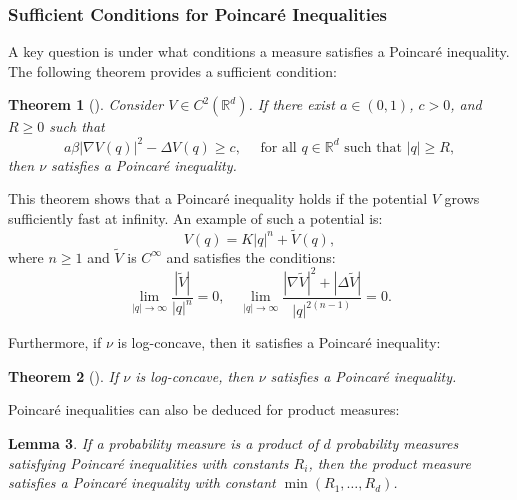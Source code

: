 \documentclass[11pt, twoside]{report}
\newtheorem{theorem}{Theorem}[section]
\newtheorem{lemma}[theorem]{Lemma}
\begin{document}
\subsubsection{Sufficient Conditions for Poincar\'{e} Inequalities}

A key question is under what conditions a measure satisfies a Poincar\'e inequality. The following theorem provides a sufficient condition:

\begin{theorem}[\texorpdfstring{\cite[Corollary 1.6]{Bakry2008}}{}]
Consider $V \in C^2(\mathbb{R}^d)$. If there exist $a \in (0,1)$, $c>0$, and $R \geq 0$ such that
\begin{equation}
a\beta |\nabla V(q)|^2 - \Delta V(q) \geq c, \quad \text{ for all } q \in \mathbb{R}^d \text{ such that } |q| \geq R,
\end{equation}
then $\nu$ satisfies a Poincar\'e inequality.
\end{theorem}

This theorem shows that a Poincar\'e inequality holds if the potential $V$ grows sufficiently fast at infinity. An example of such a potential is:
\begin{equation}
V(q) = K|q|^n + \tilde{V}(q),
\end{equation}
where $n \geq 1$ and $\tilde{V}$ is $C^\infty$ and satisfies the conditions:
\begin{equation}
\lim_{|q| \to \infty} \frac{|\tilde{V}|}{|q|^n} = 0, \quad \lim_{|q| \to \infty} \frac{|\nabla \tilde{V}|^2 + |\Delta \tilde{V}|}{|q|^{2(n-1)}} = 0.
\end{equation}

Furthermore, if $\nu$ is log-concave, then it satisfies a Poincar\'e inequality:
\begin{theorem}[\texorpdfstring{\cite[Corollary 1.9]{Bakry2008}}{}]
If $\nu$ is log-concave, then $\nu$ satisfies a Poincar\'e inequality.
\end{theorem}
Poincar\'e inequalities can also be deduced for product measures:
\begin{lemma}
If a probability measure is a product of $d$ probability measures satisfying Poincar\'e inequalities with constants $R_i$, then the product measure satisfies a Poincar\'e inequality with constant $\min(R_1, \dots, R_d)$.
\end{lemma}\
\end{document}
